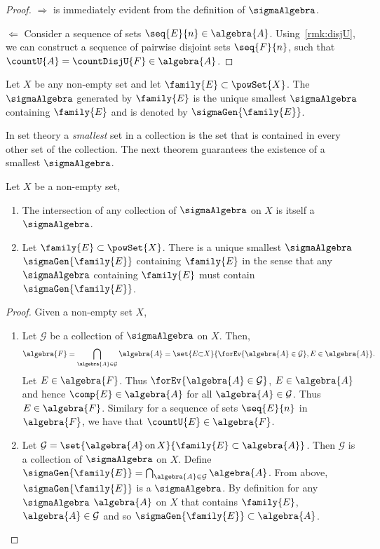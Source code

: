 \begin{proof}
    $\Rightarrow$ is immediately evident from the definition of $\sigmaAlgebra$. 

    $\Leftarrow$ Consider a sequence of sets $\seq{E}{n} \in \algebra{A}$. Using~\ref{rmk:disjU},
	we can construct a sequence of pairwise disjoint sets $\seq{F}{n}$, such that $\countU{A} =
	\countDisjU{F} \in \algebra{A}$. 
\end{proof}
\begin{Definition}[name=Generated $\sigmaAlgebra$]
    Let $X$ be any non-empty set and let $\family{E} \subset \powSet{X}$. The $\sigmaAlgebra$
    generated by $\family{E}$ is the unique smallest $\sigmaAlgebra$ containing $\family{E}$ and is
    denoted by $\sigmaGen{\family{E}}$.
\end{Definition}
In set theory a \emph{smallest} set in a collection is the set that is contained in every other set
of the collection. The next theorem guarantees the existence of a smallest $\sigmaAlgebra$.
\begin{Theorem}[name=Sigma Algebra generated by an arbitrary collection]\label{thm:sigma_al_gen}
    Let $X$ be a non-empty set,
    \begin{enumerate}
	\item
	    The intersection of any collection of $\sigmaAlgebra$ on $X$ is
	    itself a $\sigmaAlgebra$.
	\item 
	    Let $\family{E} \subset \powSet{X}$. There is a unique smallest $\sigmaAlgebra$
	    $\sigmaGen{\family{E}}$ containing $\family{E}$ in the sense that any $\sigmaAlgebra$ 
	    containing $\family{E}$ must contain $\sigmaGen{\family{E}}$.
    \end{enumerate}
\end{Theorem}
\begin{proof}
    Given a non-empty set $X$,
    \begin{enumerate}
	\item
	    Let $\mathcal{G}$ be a collection of $\sigmaAlgebra$ on $X$. Then,
	    \begin{equation*}
		\algebra{F} = \bigcap_{\algebra{A} \in \mathcal{G}}\algebra{A} =
		\set{E{\subset}X}{\forEv{\algebra{A}\in\mathcal{G}},E\in\algebra{A}}.
	    \end{equation*}
	    Let $E \in \algebra{F}$. Thus $\forEv{\algebra{A} \in \mathcal{G}}$, $E \in \algebra{A}$ and
	    hence $\comp{E} \in \algebra{A}$ for all $\algebra{A} \in \mathcal{G}$. Thus $E \in
	    \algebra{F}$. Similary for a sequence of sets $\seq{E}{n}$ in $\algebra{F}$, 
	    we have that $\countU{E} \in \algebra{F}$.
	\item
	    Let $\mathcal{G} = \set{\algebra{A}\,\text{on}\,X}{\family{E}\subset\algebra{A}}$. Then
	    $\mathcal{G}$ is a collection of $\sigmaAlgebra$ on $X$.
	    Define $\sigmaGen{\family{E}} = \bigcap_{\algebra{A} \in \mathcal{G}}\algebra{A}$. From above,
	    $\sigmaGen{\family{E}}$ is a $\sigmaAlgebra$. By definition for any $\sigmaAlgebra$ $\algebra{A}$
	    on $X$ that contains $\family{E}$, $\algebra{A} \in \mathcal{G}$ and so
	    $\sigmaGen{\family{E}}
	    \subset\algebra{A}$.
    \end{enumerate}
\end{proof}
